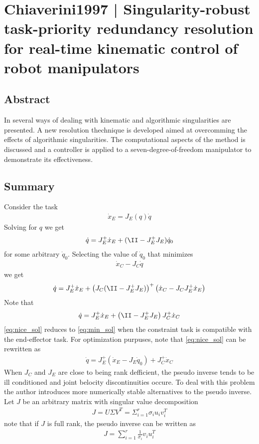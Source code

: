 \section{Chiaverini1997 | Singularity-robust task-priority redundancy resolution for real-time kinematic control of robot
manipulators}

\cite{chiaverini1997} 

\subsection{Abstract}

In \cite{chiaverini1997} several ways of dealing with kinematic and algorithmic singularities are presented. A new resolution thechnique is developed aimed at overcomming the effects of algorithmic singularities. The computational aspects of the method is discussed and a controller is applied to a seven-degree-of-freedom manipulator to demonstrate its effectiveness.

\subsection{Summary}

Consider the task
\begin{align}
    \dot x_E = J_E(q) \dot q
\end{align}
Solving for $q$ we get
\begin{align}
    \dot q = J_E^+ \dot x_E + (\II - J_E^+J_E)\dot q_0
\end{align}
for some arbitrary $\dot q_0$. Selecting the value of $\dot q_0$ that minimizes
\begin{align}
    \dot x_C - J_C \dot q
\end{align}
we get
\begin{align}
    \dot q = J_E^+ \dot x_E + \left(J_C(\II - J_E^+J_E)\right)^+ \left(\dot x_C - J_C J_E^+ \dot x_E\right) \label{eq:min_sol}
\end{align}
Note that
\begin{align}
    \dot q = J_E^+ \dot x_E + \left(\II - J_E^+J_E\right)J_C^+ \dot x_C \label{eq:nice_sol}
\end{align}
\autoref{eq:nice_sol} reduces to \autoref{eq:min_sol} when the constraint task is compatible with the end-effector task. For optimization purpuses, note that \autoref{eq:nice_sol} can be rewritten as
\begin{align}
    \dot q = J_E^+\left(\dot x_E - J_E \dot q_0\right) + J_C^+ \dot x_C
\end{align}
When $J_C$ and $J_E$ are close to being rank defficient, the pseudo inverse tends to be ill conditioned and joint belocity discontinuities occure. To deal with this problem the author introduces more numerically stable alternatives to the pseudo inverse. Let $J$ be an arbitrary matrix with singular value decomposition
\begin{align}
    J = U \Sigma V^T = \Sigma_{i=1}^r \sigma_i u_i v_i^T
\end{align}
note that if $J$ is full rank, the pseudo inverse can be written as
\begin{align}
    J = \sum_{i=1}^r \frac{1}{\sigma_i} v_i u_i^T
\end{align}
